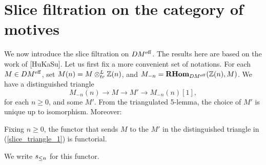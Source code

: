 \section{Slice filtration on the category of motives}

We now introduce the slice filtration on $DM^{\mathrm{eff}}$. The results here
are based on the work of [HuKaSu]. Let us first fix a more 
convenient set of notations. For each $M \in DM^{\mathrm{eff}}$, set $M(n) = 
M \otimes^{L}_{tr} \mathbb{Z}(n)$, and $M_{-n} = \mathbf{RHom}_{DM^{\mathrm{eff}}}(\mathbb{Z}(n), M)$. We have a 
distinguished triangle 
\begin{equation}\label{slice_triangle_1}
M_{-n}(n) \to M \to M' \to M_{-n}(n)[1],
\end{equation}
for each $n \geq 0$, and some $M'$. From the triangulated 
5-lemma, the choice of $M'$ is unique up to isomorphism. Moreover:

\begin{prop}
Fixing $n \geq 0$, the functor that sends $M$ to the $M'$ in the
distinguished triangle in (\ref{slice_triangle_1}) is functorial.
\end{prop}

We write $s_{\leq n}$ for this functor.
   


